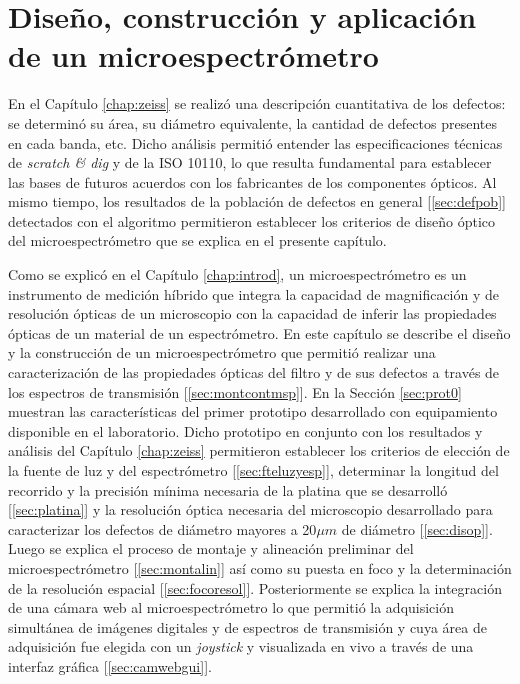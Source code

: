 \singlespacing
\chapter{Diseño, construcción y aplicación de un microespectrómetro}
\label{chap:microsp}

\hspace{0.5cm}En el Capítulo \ref{chap:zeiss} se realizó una descripción cuantitativa de los defectos: se determinó su área, su diámetro equivalente, la cantidad de defectos presentes en cada banda, etc. Dicho análisis permitió entender las especificaciones técnicas de \textit{scratch \& dig} y de la ISO 10110, lo que resulta fundamental para establecer las bases de futuros acuerdos con los fabricantes de los componentes ópticos. Al mismo tiempo, los resultados de la población de defectos en general [\ref{sec:defpob}] detectados con el algoritmo permitieron establecer los criterios de diseño óptico del microespectrómetro que se explica en el presente capítulo.

Como se explicó en el Capítulo \ref{chap:introd}, un microespectrómetro es un instrumento de medición híbrido que integra la capacidad de magnificación y de resolución ópticas de un microscopio con la capacidad de inferir las propiedades ópticas de un material de un espectrómetro. En este capítulo se describe el diseño y la construcción de un microespectrómetro que permitió realizar una caracterización de las propiedades ópticas del filtro y de sus defectos a través de los espectros de transmisión [\ref{sec:montcontmsp}]. En la Sección \ref{sec:prot0} muestran las características del primer prototipo desarrollado con equipamiento disponible en el laboratorio. Dicho prototipo en conjunto con los resultados y análisis del Capítulo \ref{chap:zeiss} permitieron establecer los criterios de elección de la fuente de luz y del espectrómetro [\ref{sec:fteluzyesp}], determinar la longitud del recorrido y la precisión mínima necesaria de la platina que se desarrolló [\ref{sec:platina}] y la resolución óptica necesaria del microscopio desarrollado para caracterizar los defectos de diámetro mayores a 20$\mu m$ de diámetro [\ref{sec:disop}]. Luego se explica el proceso de montaje y alineación preliminar del microespectrómetro [\ref{sec:montalin}] así como su puesta en foco y la determinación de la resolución espacial [\ref{sec:focoresol}]. Posteriormente se explica la integración de una cámara web al microespectrómetro lo que permitió la adquisición simultánea de imágenes digitales y de espectros de transmisión y cuya área de adquisición fue elegida con un \textit{joystick} y visualizada en vivo a través de una interfaz gráfica [\ref{sec:camwebgui}].

